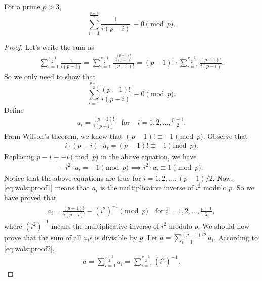 \documentclass[12pt]{subfile}
\begin{document}
		\begin{lemma}\label{lem:wolstproof4}
			For a prime $p>3$,
			$$\displaystyle\sum_{i=1}^{\frac{p-1}{2}} \frac{1}{i(p-i)} \equiv 0 \pmod p.$$
		\end{lemma}
	
		\begin{proof}
			Let's write the sum as
				\begin{align*}
					\sum_{i=1}^{\frac{p-1}{2}} \frac{1}{i(p-i)} = \sum_{i=1}^{\frac{p-1}{2}} \frac{\frac{(p-1)!}{i(p-i)}}{(p-1)!} = (p-1)! \cdot \sum_{i=1}^{\frac{p-1}{2}} \frac{(p-1)!}{i(p-i)}.
				\end{align*}
			So we only need to show that $$\displaystyle \sum_{i=1}^{\frac{p-1}{2}} \frac{(p-1)!}{i(p-i)} \equiv 0 \pmod p.$$
			Define
				\begin{align*}
					a_i = \frac{(p-1)!}{i(p-i)} \quad \text{for} \quad i=1,2,\ldots,\frac{p-1}{2}.
				\end{align*}
			From Wilson's theorem, we know that $(p-1)! \equiv -1 \pmod p$. Observe that
				\begin{align*}
					i\cdot (p-i) \cdot a_i = (p-1)! \equiv -1 \pmod p.
				\end{align*}
			Replacing $p-i \equiv -i \pmod p$ in the above equation, we have
				\begin{align}\label{eq:wolstproof1}
					-i^2 \cdot a_i = -1 \pmod p \implies i^2 \cdot a_i \equiv 1 \pmod p.
				\end{align}
			Notice that the above equations are true for $i=1,2,\ldots,(p-1)/2$. Now, \eqref{eq:wolstproof1} means that $a_i$ is the multiplicative inverse of $i^2$ modulo $p$. So we have proved that
				\begin{align}\label{eq:wolstproof2}
					a_i = \frac{(p-1)!}{i(p-i)} \equiv (i^2)^{-1} \pmod p\quad \text{for } i=1,2,\ldots,\frac{p-1}{2},
				\end{align}
			where $(i^2)^{-1}$ means the multiplicative inverse of $i^2$ modulo $p$. We should now prove that the sum of all $a_i$s is divisible by $p$. Let $\displaystyle a= \sum_{i=1}^{(p-1)/2} a_i$. According to \eqref{eq:wolstproof2},
				\begin{align*}
					a= \sum_{i=1}^{\frac{p-1}{2}} a_i = \sum_{i=1}^{\frac{p-1}{2}} (i^2)^{-1}.

\end{align*}
\end{proof}
\end{document}
